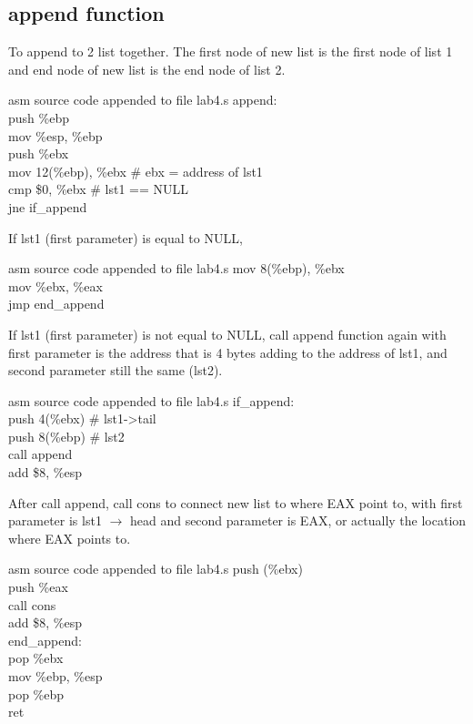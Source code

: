 \documentclass{article}
\begin{document}
\subsection{append function}
To append to 2 list together. The first node of new list is the first node of list 1 and end node of new list is the end node of list 2.
\begin{multicols}{2}
\begin{GFT}{asm source code appended to file lab4.s}
\+append:\\
\+ push \%ebp\\
\+ mov \%esp, \%ebp\\
\+ push \%ebx\\
\+ mov 12(\%ebp), \%ebx 	\# ebx = address of lst1\\
\+ cmp \$0, \%ebx	 	\# lst1 == NULL\\
\+ jne if\_append\\
\end{GFT}
If lst1 (first parameter) is equal to NULL, 
\begin{GFT}{asm source code appended to file lab4.s}
\+ mov 8(\%ebp), \%ebx\\
\+ mov \%ebx, \%eax\\
\+ jmp end\_append\\
\end{GFT}
If lst1 (first parameter) is not equal to NULL, call append function again with first parameter is the address that is 4 bytes adding to the address of lst1, and second parameter still the same (lst2).
\columnbreak
\begin{GFT}{asm source code appended to file lab4.s}
\+if\_append:\\
\+ push 4(\%ebx)		\# lst1->tail\\
\+ push 8(\%ebp) 		\# lst2\\
\+ call append\\
\+ add \$8, \%esp\\
\end{GFT}
After call append, call cons to connect new list to where EAX point to, with first parameter is lst1 $\rightarrow$ head and second parameter is EAX, or actually the location where EAX points to.
\begin{GFT}{asm source code appended to file lab4.s}
\+ push (\%ebx)\\
\+ push \%eax\\
\+ call cons	\\
\+ add \$8, \%esp\\
\+end\_append:\\
\+ pop \%ebx\\
\+ mov \%ebp, \%esp\\
\+ pop \%ebp\\
\+ ret\\
\end{GFT}
\end{multicols}
\pagebreak
\end{document}
